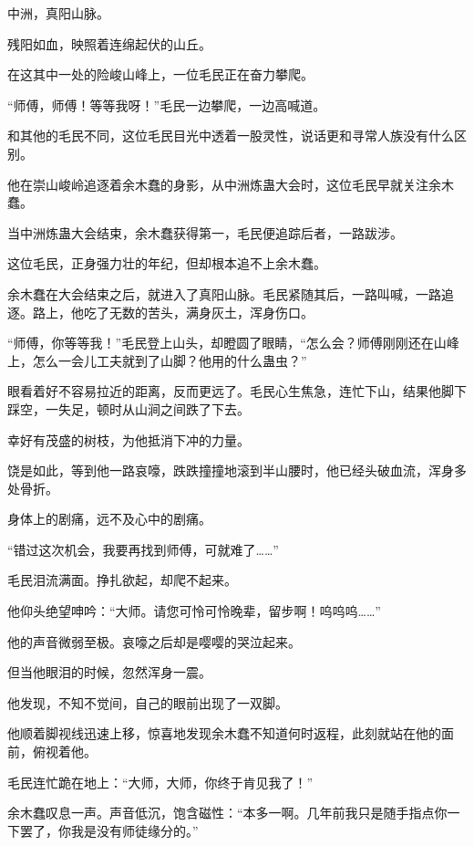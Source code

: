 
\begin{this_body}



中洲，真阳山脉。

残阳如血，映照着连绵起伏的山丘。

在这其中一处的险峻山峰上，一位毛民正在奋力攀爬。

“师傅，师傅！等等我呀！”毛民一边攀爬，一边高喊道。

和其他的毛民不同，这位毛民目光中透着一股灵性，说话更和寻常人族没有什么区别。

他在崇山峻岭追逐着余木蠢的身影，从中洲炼蛊大会时，这位毛民早就关注余木蠢。

当中洲炼蛊大会结束，余木蠢获得第一，毛民便追踪后者，一路跋涉。

这位毛民，正身强力壮的年纪，但却根本追不上余木蠢。

余木蠢在大会结束之后，就进入了真阳山脉。毛民紧随其后，一路叫喊，一路追逐。路上，他吃了无数的苦头，满身灰土，浑身伤口。

“师傅，你等等我！”毛民登上山头，却瞪圆了眼睛，“怎么会？师傅刚刚还在山峰上，怎么一会儿工夫就到了山脚？他用的什么蛊虫？”

眼看着好不容易拉近的距离，反而更远了。毛民心生焦急，连忙下山，结果他脚下踩空，一失足，顿时从山涧之间跌了下去。

幸好有茂盛的树枝，为他抵消下冲的力量。

饶是如此，等到他一路哀嚎，跌跌撞撞地滚到半山腰时，他已经头破血流，浑身多处骨折。

身体上的剧痛，远不及心中的剧痛。

“错过这次机会，我要再找到师傅，可就难了……”

毛民泪流满面。挣扎欲起，却爬不起来。

他仰头绝望呻吟：“大师。请您可怜可怜晚辈，留步啊！呜呜呜……”

他的声音微弱至极。哀嚎之后却是嘤嘤的哭泣起来。

但当他眼泪的时候，忽然浑身一震。

他发现，不知不觉间，自己的眼前出现了一双脚。

他顺着脚视线迅速上移，惊喜地发现余木蠢不知道何时返程，此刻就站在他的面前，俯视着他。

毛民连忙跪在地上：“大师，大师，你终于肯见我了！”

余木蠢叹息一声。声音低沉，饱含磁性：“本多一啊。几年前我只是随手指点你一下罢了，你我是没有师徒缘分的。”


\end{this_body}
